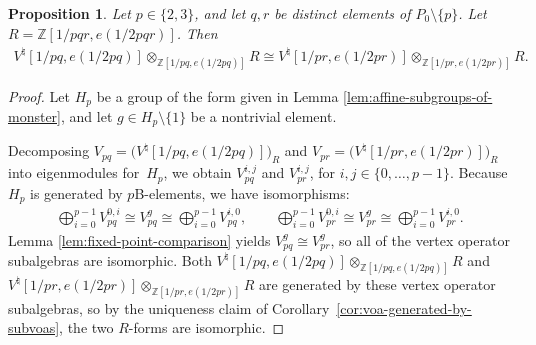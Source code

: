 \documentclass[pdftex]{sigma}
\newcommand{\bZ}{\mathbb{Z}}
\newtheorem{prop}[thm]{Proposition}
\theoremstyle{definition}
\begin{document}
\begin{prop} \label{prop:isomorphisms-of-forms-for-2-and-3}Let $p \in \{2,3\}$, and let $q,r$ be distinct elements of $P_0 \setminus \{p\}$. Let $R = \bZ[1/pqr, e(1/2pqr)]$. Then
\begin{gather*} V^\natural[1/pq, e(1/2pq)] \otimes_{\bZ[1/pq, e(1/2pq)]} R \cong V^\natural[1/pr, e(1/2pr)] \otimes_{\bZ[1/pr, e(1/2pr)]} R. \end{gather*}
\end{prop}
\begin{proof}Let $H_p$ be a group of the form given in Lemma \ref{lem:affine-subgroups-of-monster}, and let $g \in H_p \setminus \{1\}$ be a nontrivial element.

Decomposing $V_{pq} = \big(V^\natural[1/pq,e(1/2pq)]\big)_R$ and $V_{pr} = \big(V^\natural[1/pr,e(1/2pr)]\big)_R$ into eigenmodules for~$H_p$, we obtain $V_{pq}^{i,j}$ and $V_{pr}^{i,j}$, for $i,j \in \{0,\ldots,p-1\}$. Because $H_p$ is generated by $p$B-elements, we have isomorphisms:
\begin{gather*}
\bigoplus_{i=0}^{p-1} V_{pq}^{0,i} \cong V_{pq}^g \cong \bigoplus_{i=0}^{p-1} V_{pq}^{i,0},\qquad
\bigoplus_{i=0}^{p-1} V_{pr}^{0,i} \cong V_{pr}^g \cong \bigoplus_{i=0}^{p-1} V_{pr}^{i,0}.
\end{gather*}
Lemma \ref{lem:fixed-point-comparison} yields $V_{pq}^g \cong V_{pr}^g$, so all of the vertex operator subalgebras are isomorphic. Both $V^\natural[1/pq, e(1/2pq)] \otimes_{\bZ[1/pq, e(1/2pq)]} R$ and $V^\natural[1/pr, e(1/2pr)] \otimes_{\bZ[1/pr, e(1/2pr)]} R$ are generated by these vertex operator subalgebras, so by the uniqueness claim of Corollary~\ref{cor:voa-generated-by-subvoas}, the two $R$-forms are isomorphic.
\end{proof}
\end{document}
